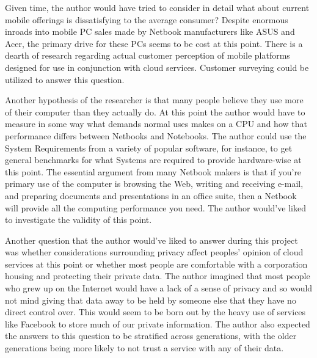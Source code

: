 

Given time, the author would have tried to consider in detail what about current
mobile offerings is dissatisfying to the average consumer?  Despite enormous
inroads into mobile PC sales made by Netbook manufacturers like ASUS and Acer,
the primary drive for these PCs seems to be cost at this
point\citep{gladstone09}.  There is a dearth of research regarding actual
customer perception of mobile platforms designed for use in conjunction with
cloud services.  Customer surveying could be utilized to answer this question.

Another hypothesis of the researcher is that many people believe they use more
of their computer than they actually do.  At this point the author would have to
measure in some way what demands normal uses makes on a CPU and how that
performance differs between Netbooks and Notebooks.  The author could use the
System Requirements from a variety of popular software, for instance, to get
general benchmarks for what Systems are required to provide hardware-wise at
this point.  The essential argument from many Netbook makers is that if you're
primary use of the computer is browsing the Web, writing and receiving e-mail,
and preparing documents and presentations in an office suite, then a Netbook
will provide all the computing performance you need.  The author would've liked
to investigate the validity of this point.

Another question that the author would've liked to answer during this project
was whether considerations surrounding privacy affect peoples' opinion of cloud
services at this point or whether most people are comfortable with a corporation
housing and protecting their private data.  The author imagined that most people
who grew up on the Internet would have a lack of a sense of privacy and so would
not mind giving that data away to be held by someone else that they have no
direct control over.  This would seem to be born out by the heavy use of
services like Facebook to store much of our private information.  The author
also expected the answers to this question to be stratified across generations,
with the older generations being more likely to not trust a service with any of
their data.

